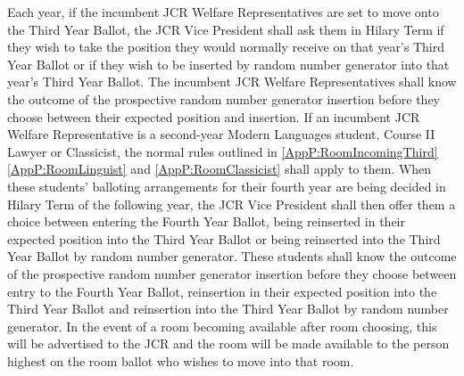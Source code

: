 \appnpara Each year, if the incumbent JCR Welfare Representatives are set to move onto the Third Year Ballot, the JCR Vice President shall ask them in Hilary Term if they wish to take the position they would normally receive on that year’s Third Year Ballot or if they wish to be inserted by random number generator into that year’s Third Year Ballot. The incumbent JCR Welfare Representatives shall know the outcome of the prospective random number generator insertion before they choose between their expected position and insertion. If an incumbent JCR Welfare Representative is a second-year Modern Languages student, Course II Lawyer or Classicist, the normal rules outlined in \ref{AppP:RoomIncomingThird}\ref{AppP:RoomLinguist} and \ref{AppP:RoomClassicist} shall apply to them. When these students’ balloting arrangements for their fourth year are being decided in Hilary Term of the following year, the JCR Vice President shall then offer them a choice between entering the Fourth Year Ballot, being reinserted in their expected position into the Third Year Ballot or being reinserted into the Third Year Ballot by random number generator.
These students shall know the outcome of the prospective random number generator insertion before they choose between entry to the Fourth Year Ballot, reinsertion in their expected position into the Third Year Ballot and reinsertion into the Third Year Ballot by random number generator.
\appnpara \label{AppP:RoomAvailable} In the event of a room becoming available after room choosing, this will be advertised to the JCR and the room will be made available to the person highest on the room ballot who wishes to move into that room.
